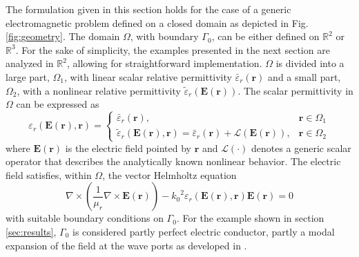 \documentclass[journal]{IEEEtran}
\renewcommand{\vec}[1]{\mathbf{#1}}
\begin{document}
\par The formulation given in this section holds for the case of a generic electromagnetic problem defined on a closed domain as depicted in Fig. \ref{fig:geometry}. The domain $\Omega$, with boundary $\Gamma_0$, can be either defined on $\mathbb R^2$ or $\mathbb R^3$. For the sake of simplicity, the examples presented in the next section are analyzed in $\mathbb R^2$, allowing for straightforward implementation. $\Omega$ is divided into a large part, $\Omega_1$, with linear scalar relative permittivity $\bar{\varepsilon}_r(\vec{r})$ and a small part, $\Omega_2$, with a nonlinear relative permittivity $\tilde{\varepsilon}_r(\vec{E}(\vec{r}))$.
The scalar permittivity in $\Omega$ can be expressed as 
\begin{equation}
\varepsilon_r(\vec{E}(\vec{r}),\vec{r}) = 
\begin{cases}
\bar{\varepsilon}_r(\vec{r}), & \vec{r} \in \Omega_1 \\
\tilde{\varepsilon}_r(\vec{E}(\vec{r}), \vec{r}) = \bar{\varepsilon}_r(\vec{r}) + \mathcal{L}(\vec{E}(\vec{r})), & \vec{r} \in \Omega_2
\end{cases}
\end{equation} where $\vec{E}(\vec{r})$ is the electric field pointed by $\vec{r}$ and $\mathcal{L}(\cdot)$ denotes a generic scalar operator that describes the analytically known nonlinear behavior. The electric field satisfies, within $\Omega$, the vector Helmholtz equation
\begin{equation}
\label{eq:helmholtz}
\nabla \times \left ( \frac{1}{\mu_r} \nabla \times \vec{E}(\vec{r}) \right )  - {k_0}^2 \varepsilon_r \left(\vec{E}(\vec{r}), \vec{r} \right) \vec{E}(\vec{r}) = 0
\end{equation} with suitable boundary conditions on $\Gamma_0$. For the example shown in section \ref{sec:results}, $\Gamma_0$ is considered partly perfect electric conductor, partly a modal expansion of the field at the wave ports as developed in \cite{Pelosi2009}. 
\end{document}
